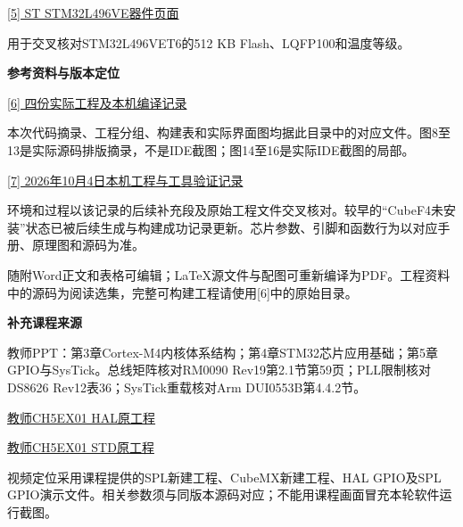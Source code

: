 \documentclass[10pt,a4paper]{article}
\newcommand{\qtitle}[1]{{\Large\bfseries #1}\par\vspace{4pt}}
\newcommand{\qsub}[1]{{\bfseries #1}\par}
\begin{document}
\href{https://www.st.com/en/microcontrollers-microprocessors/stm32l496ve.html}{[5] ST STM32L496VE器件页面}\par
用于交叉核对STM32L496VET6的512 KB Flash、LQFP100和温度等级。


\clearpage
{}
\qtitle{参考资料与版本定位}
\href{https://drive.google.com/drive/folders/1PP6caucxd0rbkspc_7IDALtIaz1bU5kz}{[6] 四份实际工程及本机编译记录}\par
本次代码摘录、工程分组、构建表和实际界面图均据此目录中的对应文件。图8至13是实际源码排版摘录，不是IDE截图；图14至16是实际IDE截图的局部。

\href{https://drive.google.com/file/d/16aZsBIdPqjkYs0ldyzE22hmRR2uYA8LM/view}{[7] 2026年10月4日本机工程与工具验证记录}\par
环境和过程以该记录的后续补充段及原始工程文件交叉核对。较早的“CubeF4未安装”状态已被后续生成与构建成功记录更新。芯片参数、引脚和函数行为以对应手册、原理图和源码为准。

随附Word正文和表格可编辑；LaTeX源文件与配图可重新编译为PDF。工程资料中的源码为阅读选集，完整可构建工程请使用[6]中的原始目录。

\qsub{补充课程来源}
教师PPT：第3章Cortex-M4内核体系结构；第4章STM32芯片应用基础；第5章GPIO与SysTick。总线矩阵核对RM0090 Rev19第2.1节第59页；PLL限制核对DS8626 Rev12表36；SysTick重载核对Arm DUI0553B第4.4.2节。

\href{https://drive.google.com/file/d/1SiaXWNtQBBjrw8Dl70PK68exQ3V929ve/view}{教师CH5EX01 HAL原工程}\par
\href{https://drive.google.com/file/d/1BVRke_0FVb91vsfTokTQznbfqVBA4-GZ/view}{教师CH5EX01 STD原工程}\par
视频定位采用课程提供的SPL新建工程、CubeMX新建工程、HAL GPIO及SPL GPIO演示文件。相关参数须与同版本源码对应；不能用课程画面冒充本轮软件运行截图。
\end{document}
